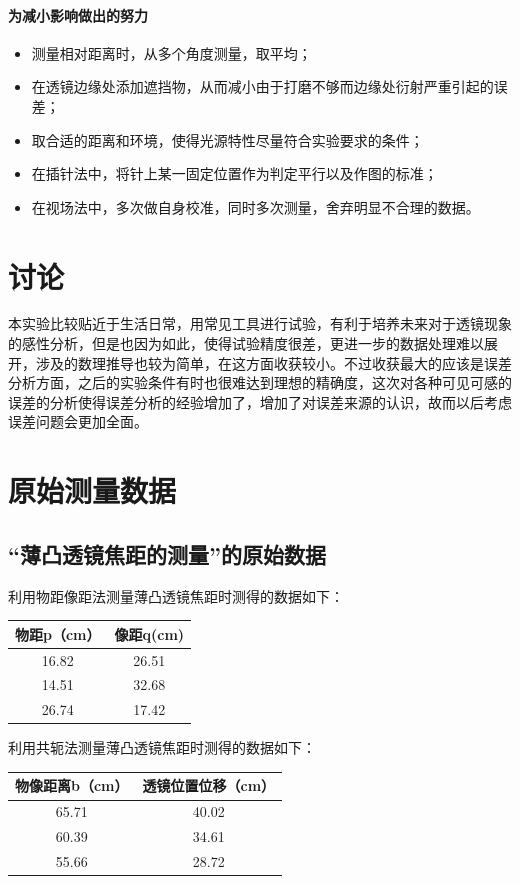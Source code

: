 \documentclass[UTF8]{ctexart}
\begin{document}
\paragraph{为减小影响做出的努力}
\begin{itemize}
\item 测量相对距离时，从多个角度测量，取平均；
\item 在透镜边缘处添加遮挡物，从而减小由于打磨不够而边缘处衍射严重引起的误差；
\item 取合适的距离和环境，使得光源特性尽量符合实验要求的条件；
\item 在插针法中，将针上某一固定位置作为判定平行以及作图的标准；
\item 在视场法中，多次做自身校准，同时多次测量，舍弃明显不合理的数据。
\end{itemize}
\section{讨论}
本实验比较贴近于生活日常，用常见工具进行试验，有利于培养未来对于透镜现象的感性分析，但是也因为如此，使得试验精度很差，更进一步的数据处理难以展开，涉及的数理推导也较为简单，在这方面收获较小。不过收获最大的应该是误差分析方面，之后的实验条件有时也很难达到理想的精确度，这次对各种可见可感的误差的分析使得误差分析的经验增加了，增加了对误差来源的认识，故而以后考虑误差问题会更加全面。
\section{原始测量数据}
\subsection{“薄凸透镜焦距的测量”的原始数据}
利用物距像距法测量薄凸透镜焦距时测得的数据如下：
\begin{table}[htbp!] 
\centering 
\begin{tabular}{|c|c|} 
\hline 
 物距p（cm） &  像距q(cm) \\ 
\hline 
16.82 & 26.51  \\ 
\hline 
14.51 & 32.68 \\ 
\hline 
26.74 & 17.42 \\ 
\hline
\end{tabular} 
\end{table}

利用共轭法测量薄凸透镜焦距时测得的数据如下：
\begin{table}[htbp!] 
\centering 
\begin{tabular}{|c|c|} 
\hline 
 物像距离b（cm） &  透镜位置位移（cm）  \\ 
\hline 
65.71 & 40.02 \\ 
\hline 
60.39 & 34.61 \\ 
\hline 
55.66 & 28.72  \\ 
\hline
\end{tabular} 
\end{table}
\end{document}
